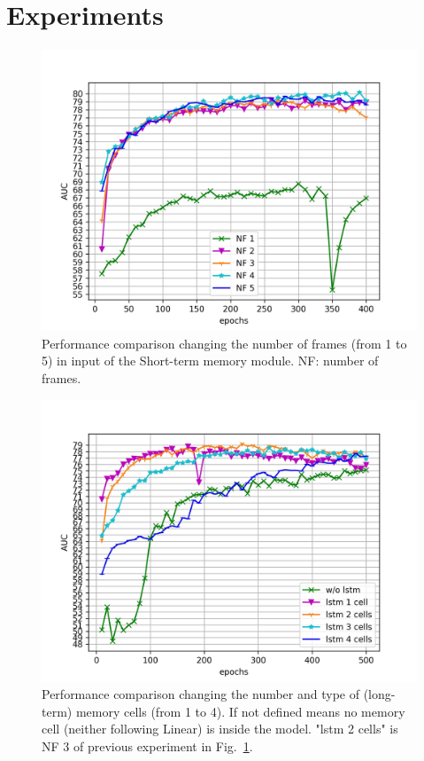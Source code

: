 \section{Experiments}
\label{sec:experiments}

\begin{figure}[t]
\centering
	\includegraphics[trim=0 0 0 0, clip, width=1.\linewidth]{images/exp_1.jpg}
	\caption{Performance comparison changing the number of frames (from 1 to 5) in input of the Short-term memory module. NF: number of frames. }
	\label{fig:num-frames-vst}
\end{figure}

\begin{figure}[t]
\centering
	\includegraphics[trim=0 0 0 0, clip, width=1.\linewidth]{images/exp_2.jpg}
	\caption{Performance comparison changing the number and type of (long-term) memory cells (from 1 to 4). If not defined means no memory cell (neither following Linear) is inside the model. "lstm 2 cells" is NF 3 of previous experiment in Fig.~\ref{fig:num-frames-vst}.}
	\label{fig:num-memory-cells}
\end{figure}

